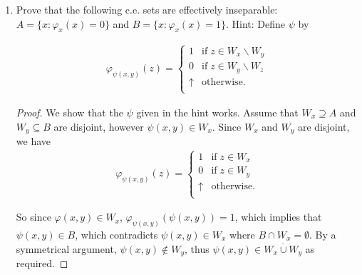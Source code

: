 \documentclass{article}
\begin{document}
\begin{enumerate}[label={\bf Q\arabic*:}]
\begin{enumerate}[label={(\roman*)}]
\begin{proof}
          The above procedure can be defined formally as follows: Let
          $h(x)$ be a recursive function such that $W_{h(x)}=W_x\cup
          \{\psi(x)\}$. $h$ exists from SMN. To compute $\psi'(n+1)$,
          enumerate
          \[\{\psi(n+1), \psi h(n+1), \psi h^2(n+1),\ldots\}\]
          until either some $y$ not in $\{\psi'(0),\ldots,\psi'(n)\}$ is
          found, or a repetition occurs. Then set $\psi'(n+1)=y$. Note that
          $\psi'$ will be total recursive from the Church-Turing thesis.
        \end{proof}

      \item Prove that the following c.e. sets are effectively inseparable:
        $A=\{x:\varphi_x(x)=0\}$ and $B=\{x:\varphi_x(x)=1\}$. Hint: Define
        $\psi$ by

        \begin{align*}
          \varphi_{\psi(x,y)}(z)=
          \begin{cases}
            1 &\text{if}\; z\in W_x\backslash W_y\\
            0 &\text{if}\; z\in W_y\backslash W_z\\
            \uparrow &\text{otherwise}.\\
          \end{cases}
        \end{align*}

        \begin{proof}
          We show that the $\psi$ given in the hint works. Assume that
          $W_x\supseteq A$ and $W_y\subseteq B$ are disjoint, however
          $\psi(x,y)\in W_x$. Since $W_x$ and $W_y$ are disjoint, we have
          \begin{align*}
            \varphi_{\psi(x,y)}(z)=
            \begin{cases}
              1 &\text{if}\; z\in W_x\\
              0 &\text{if}\; z\in W_y\\
              \uparrow &\text{otherwise}.\\
            \end{cases}
          \end{align*}

          So since $\varphi(x,y)\in W_x$,
          $\varphi_{\psi(x,y)}(\psi(x,y))=1$, which implies that
          $\psi(x,y)\in B$, which contradicts $\psi(x,y)\in W_x$ where
          $B\cap W_x=\emptyset$. By a symmetrical argument,
          $\psi(x,y)\not\in W_y$, thus $\psi(x,y)\in\overline{W_x\cup W_y}$
          as required.
        \end{proof}


\end{enumerate}
\end{enumerate}
\end{document}

